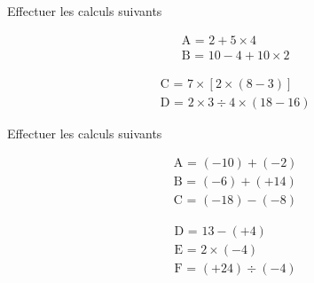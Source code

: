 \documentclass[12pt,a4paper]{article}
\begin{document}
\renewcommand{\labelitemi}{\textbullet}

\begin{center}
    {\Large{}}
\end{center}



\begin{exercicebox}
    Effectuer les calculs suivants 
    \begin{minipage}{0.49\textwidth}
        \begin{align*}
        &\text{A = }2+5\times4\\
        &\text{B = }10-4+10\times2
        \end{align*}
    \end{minipage}
    \hfill
    \begin{minipage}{0.49\textwidth}
        \begin{align*}
            &\text{C = }7\times[2\times(8-3)]\\
            &\text{D = } 2\times3\div4\times(18-16)
        \end{align*}
    \end{minipage}
\end{exercicebox}

\begin{exercicebox}
    Effectuer les calculs suivants 

    \begin{minipage}{0.49\textwidth}
    \begin{align*}
        &\text{A = }(-10)+(-2)\\
        &\text{B = }(-6)+(+14)\\
        &\text{C = }(-18)-(-8)
    \end{align*}
    \end{minipage}
    \hfill
    \begin{minipage}{0.49\textwidth}
    \begin{align*}
        &\text{D = }13-(+4)\\
        &\text{E = }2\times(-4)\\
        &\text{F = }(+24)\div(-4)
    \end{align*}
    \end{minipage}
\end{exercicebox}
\end{document}
